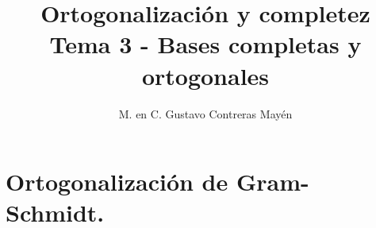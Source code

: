 
\usepackage{apacite}
\title{Ortogonalización y completez \\[0.3em]  \large{Tema 3 - Bases completas y ortogonales}\vspace{-3ex}}
\author{M. en C. Gustavo Contreras Mayén}
\date{ }

\vspace{-4cm}
\maketitle
\fontsize{14}{14}\selectfont
\tableofcontents
\newpage
\section{Ortogonalización de Gram-Schmidt.}

